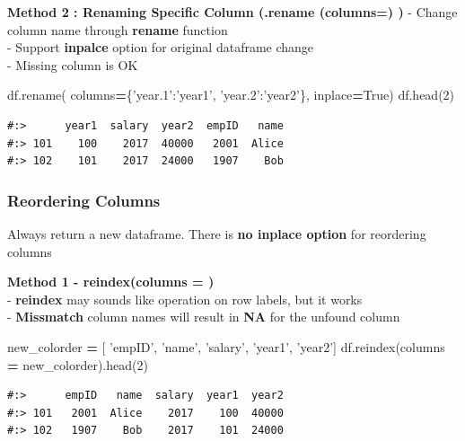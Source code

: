 \documentclass[
]{book}
\newenvironment{Shaded}{\begin{snugshade}}{\end{snugshade}}
\newcommand{\DecValTok}[1]{\textcolor[rgb]{0.06,0.06,0.06}{#1}}
\newcommand{\NormalTok}[1]{#1}
\newcommand{\OperatorTok}[1]{\textcolor[rgb]{0.43,0.43,0.43}{\textbf{#1}}}
\newcommand{\StringTok}[1]{\textcolor[rgb]{0.5,0.5,0.5}{#1}}
\newcommand{\VariableTok}[1]{\textcolor[rgb]{0,0,0}{#1}}
\begin{document}
\textbf{Method 2 : Renaming Specific Column (.rename (columns=) )} - Change column name through \textbf{rename} function\\
- Support \textbf{inpalce} option for original dataframe change\\
- Missing column is OK

\begin{Shaded}
\begin{Highlighting}[]
\NormalTok{df.rename( columns}\OperatorTok{=}\NormalTok{\{}\StringTok{'year.1'}\NormalTok{:}\StringTok{'year1'}\NormalTok{, }\StringTok{'year.2'}\NormalTok{:}\StringTok{'year2'}\NormalTok{\}, inplace}\OperatorTok{=}\VariableTok{True}\NormalTok{)}
\NormalTok{df.head(}\DecValTok{2}\NormalTok{)}
\end{Highlighting}
\end{Shaded}

\begin{verbatim}
#:>      year1  salary  year2  empID   name
#:> 101    100    2017  40000   2001  Alice
#:> 102    101    2017  24000   1907    Bob
\end{verbatim}

\hypertarget{reordering-columns}{%
\subsubsection{Reordering Columns}\label{reordering-columns}}

Always return a new dataframe. There is \textbf{no inplace option} for reordering columns

\textbf{Method 1 - reindex(columns = )}\\
- \textbf{reindex} may sounds like operation on row labels, but it works\\
- \textbf{Missmatch} column names will result in \textbf{NA} for the unfound column

\begin{Shaded}
\begin{Highlighting}[]
\NormalTok{new_colorder }\OperatorTok{=}\NormalTok{ [ }\StringTok{'empID'}\NormalTok{, }\StringTok{'name'}\NormalTok{, }\StringTok{'salary'}\NormalTok{, }\StringTok{'year1'}\NormalTok{, }\StringTok{'year2'}\NormalTok{]}
\NormalTok{df.reindex(columns }\OperatorTok{=}\NormalTok{ new_colorder).head(}\DecValTok{2}\NormalTok{)}
\end{Highlighting}
\end{Shaded}

\begin{verbatim}
#:>      empID   name  salary  year1  year2
#:> 101   2001  Alice    2017    100  40000
#:> 102   1907    Bob    2017    101  24000
\end{verbatim}
\end{document}
